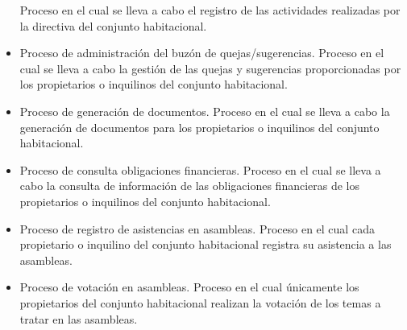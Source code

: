 \begin{itemize}
    Proceso en el cual se lleva a cabo el registro de las actividades realizadas por la directiva del conjunto habitacional.
    \item Proceso de administración del buzón de quejas/sugerencias.
    Proceso en el cual se lleva a cabo la gestión de las quejas y sugerencias proporcionadas por los propietarios o inquilinos del conjunto habitacional.
    \item Proceso de generación de documentos.
    Proceso en el cual se lleva a cabo la generación de documentos para los propietarios o inquilinos del conjunto habitacional.
    \item Proceso de consulta obligaciones financieras.
    Proceso en el cual se lleva a cabo la consulta de información de las obligaciones financieras de los propietarios o inquilinos del conjunto habitacional.
    \item Proceso de registro de asistencias en asambleas.
    Proceso en el cual cada propietario o inquilino del conjunto habitacional registra su asistencia a las asambleas.
    \item Proceso de votación en asambleas.
    Proceso en el cual únicamente los propietarios del conjunto habitacional realizan la votación de los temas a tratar en las asambleas.
\end{itemize}

